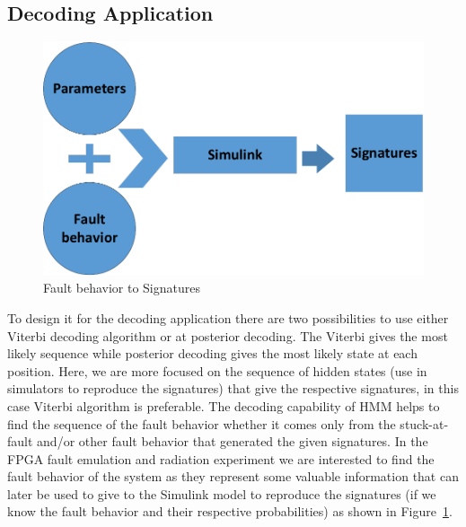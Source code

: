 \subsection{Decoding Application}
\begin{figure}[tb!]
 \centering
  \captionsetup{justification=centering}    
   \includegraphics[scale=0.8]{Figures/fromhiddentosignature.pdf}
   \caption{Fault behavior to Signatures}
\label{fig:HMMsig}
\end{figure}
To design it for the decoding application there are two possibilities to use either Viterbi decoding algorithm or at posterior decoding. The Viterbi gives the most likely sequence while posterior decoding gives the most likely state at each position. Here, we are more focused on the sequence of hidden states (use in simulators to reproduce the signatures) that give the respective signatures, in this case Viterbi algorithm is preferable. The decoding capability of HMM helps to find the sequence of the fault behavior whether it comes only from the stuck-at-fault and/or other fault behavior that generated the given signatures. In the FPGA fault emulation and radiation experiment we are interested to find the fault behavior of the system as they represent some valuable information that can later be used to give to the Simulink model to reproduce the signatures (if we know the fault behavior and their respective probabilities) as shown in Figure~\ref{fig:HMMsig}.

